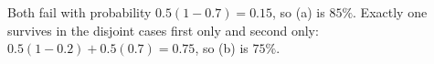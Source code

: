 Both fail with probability $0.5(1-0.7)=0.15$, so (a) is $\boxed{85\%}$. Exactly one survives in the disjoint cases first only and second only: $0.5(1-0.2)+0.5(0.7)=0.75$, so (b) is $\boxed{75\%}$.
